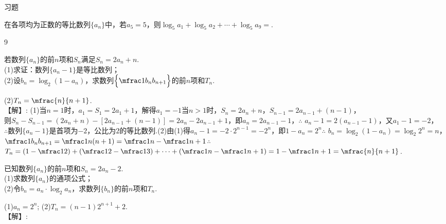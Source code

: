 \begin{exercise}{\heiti 习题}
\begin{answer}
    \end{answer}
  \item %
    在各项均为正数的等比数列$\{a_n\}$中，若$a_5=5$，则$\log_5a_1+\log_5a_2+\cdots+\log_5a_9=$\tk.
    \begin{answer}
      9
    \end{answer}
  \item %
    若数列$\{a_n\}$的前$n$项和$S_n$满足$S_n=2a_n+n$.\\
    (1)求证：数列$\{a_n-1\}$是等比数列；\\
    (2)设$b_n=\log_2(1-a_n)$，求数列$\Bigl\{\mfrac1{b_nb_{n+1}}\Bigr\}$的前$n$项和$T_n$.
    \begin{answer}
      (2)$T_n=\mfrac{n}{n+1}$.
      \\【解】:
      (1)当$n=1$时，$a_1=S_1=2a_1+1$，解得$a_1=-1$\fz[1]
         当$n>1$时，$S_n=2a_n+n$，$S_{n-1}=2a_{n-1}+(n-1)$，\\
         则$S_n-S_{n-1}=(2a_n+n)-[2a_{n-1}+(n-1)]=2a_n-2a_{n-1}+1$，即$a_n=2a_{n-1}-1$，\fz[3]
         $\therefore$ $a_n-1=2(a_{n-1}-1)$，又$a_1-1=-2$，\\
         $\therefore$数列$\{a_n-1\}$是首项为$-2$，公比为$2$的等比数列.\fz[6]
      (2)由(1)得$a_n-1=-2\cdot 2^{n-1}=-2^n$，即$1-a_n=2^n$\fz[8]
        $\therefore$ $b_n=\log_2(1-a_n)=\log_2{2^n}=n$，$\mfrac1{b_nb_{n+1}}=\mfrac1{n(n+1)}=\mfrac1n-\mfrac1{n+1}$\fz[10]
        $\therefore$ $T_n=(1-\mfrac12)+(\mfrac12-\mfrac13)+\cdots+(\mfrac1n-\mfrac1{n+1})=1-\mfrac1{n+1}=\mfrac{n}{n+1}$.\fzn[12]
    \end{answer}
  \clearpage
  \item %
    已知数列$\{a_n\}$的前$n$项和$S_n=2a_n-2$.\\
    (1)求数列$\{a_n\}$的通项公式；\\
    (2)令$b_n=a_n\cdot\log_2a_n$，求数列$\{b_n\}$的前$n$项和$T_n$.
    \begin{answer}
      (1)$a_n=2^n$;
      (2)$T_n=(n-1)2^{n+1}+2$.
      \\【解】:

\end{answer}
\end{exercise}
